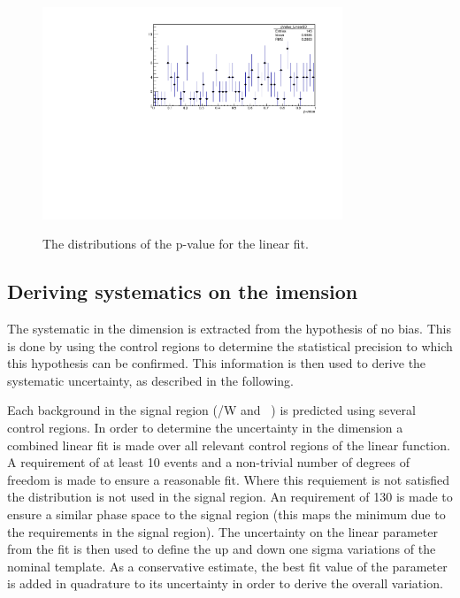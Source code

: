 \begin{figure}[h!]
  \centering
    \includegraphics[width=0.8\textwidth]{figures/template/linear/pValueAll.pdf}
  \\
  \caption{\label{fig:pValues} The distributions of the p-value for the linear fit.} 
\end{figure}
\subsection{Deriving systematics on the \texorpdfstring{\mht} dimension}
\label{sec:systMhtDimension}
The systematic in the \mht dimension is extracted from the hypothesis
of no bias. This is done by using the control regions 
to determine the statistical precision to which this hypothesis can
be confirmed. This information is then used to derive the systematic 
uncertainty, as described in the following. 

Each background in the signal region (\ttbar/W  and \zInv~) is predicted 
using several control regions. In order to determine the uncertainty in
the \mht dimension a combined linear fit is made over all relevant control regions
of the linear function. A requirement of at least 10 events and a non-trivial
number of degrees of freedom is made to ensure a reasonable fit. Where this
requiement is not satisfied the \mht distribution is not used in the signal region.
An \mht requirement of 130 \GeV is made to ensure a similar phase space to 
the signal region (this maps the minimum \mht due to the \alt requirements in the signal region).
The uncertainty on the linear parameter from the fit is then
used to define the up and down one sigma variations of the nominal template.
As a conservative estimate, the best fit value of the parameter is 
added in quadrature to its uncertainty in order to derive the overall variation.

